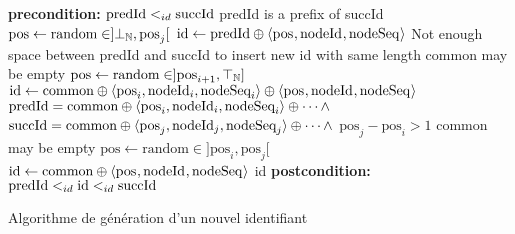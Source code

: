 \begin{algorithm}[!ht]
  \footnotesize
  \begin{algorithmic}[1]
      \Statex \Comment \textbf{precondition:} $\text{predId} <_{id} \text{succId}$
       \label{alg:logoot-generateId-if-start}
        \Statex \Comment predId is a prefix of succId
        \State $\text{pos} \gets \text{random} \in ]\bot_\mathbb{N}, \text{pos}_j[$
        \State $\text{id} \gets \text{predId} \oplus \langle \text{pos}_{},\text{nodeId}_{},\text{nodeSeq}_{} \rangle$ \label{alg:logoot-generateId-if-end}
       \label{alg:logoot-generateId-elsif-start}
        \Statex \Comment Not enough space between predId and succId
        \Statex \Comment to insert new id with same length
        \Statex \Comment common may be empty
        \State $\text{pos} \gets \text{random} \in ]\text{pos}_{i+1}, \top_\mathbb{N}]$
        \State $\text{id} \gets \text{common} \oplus \langle \text{pos}_{i},\text{nodeId}_{i},\text{nodeSeq}_{i} \rangle \oplus \langle \text{pos}_{},\text{nodeId}_{},\text{nodeSeq}_{} \rangle$ \label{alg:logoot-generateId-elsif-end}
      \Else \label{alg:logoot-generateId-else-start}
        \Statex \Comment  $\text{predId} = \text{common} \oplus \langle \text{pos}_{i},\text{nodeId}_{i},\text{nodeSeq}_{i} \rangle \oplus \cdots \land$
        \Statex \Comment $\text{succId} = \text{common} \oplus  \langle \text{pos}_{j},\text{nodeId}_{j},\text{nodeSeq}_{j} \rangle \oplus \cdots \land$
        \Statex \Comment $\text{pos}_j - \text{pos}_i > 1$
        \Statex \Comment common may be empty
        \State $\text{pos} \gets \text{random} \in ]\text{pos}_i,\text{pos}_j[$
        \State $\text{id} \gets \text{common} \oplus \langle \text{pos}_{},\text{nodeId}_{},\text{nodeSeq}_{} \rangle$ \label{alg:logoot-generateId-else-end}
      \EndIf
      \State \Return id
      \Comment \textbf{postcondition:} $\text{predId} <_{id} \text{id} <_{id} \text{succId}$
    \EndFunction
  \end{algorithmic}
  \caption{Algorithme de génération d'un nouvel identifiant}
  \label{alg:logoot-generateId}
\end{algorithm}

